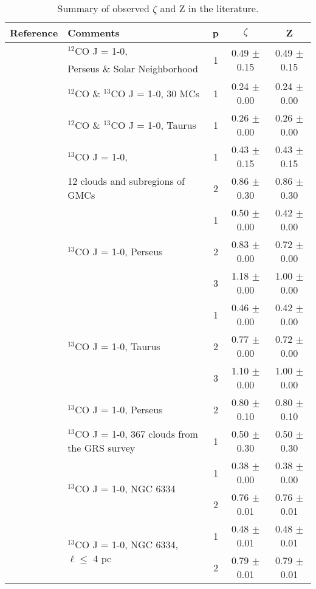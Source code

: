 \begin{table*} 
\centering 
	\begin{tabular}{l|l|ccc} 
	\centering 
		Reference & Comments & p & $\zeta$ & Z \\ \hline  \hline
		\multirow{2}{*}{\citet{Heyer2004}} & $^{12}$CO J = 1-0, & \multirow{2}{*}{1} &  \multirow{2}{*}{0.49 $\pm$  0.15} &  \multirow{2}{*}{0.49 $\pm$  0.15} \\ 
					& Perseus \& Solar Neighborhood & & & \\ \hline
		\multirow{2}{*}{\citet{Heyer2015}} & $^{12}$CO \& $^{13}$CO J = 1-0, 30 MCs & 1 &  0.24 $\pm$  0.00 &  0.24 $\pm$  0.00 \\ 
					 & $^{12}$CO \& $^{13}$CO J = 1-0, Taurus & 1 &  0.26 $\pm$  0.00 &  0.26 $\pm$  0.00 \\  \hline
		\multirow{2}{*}{\citet{Miesch1994}} & $^{13}$CO J = 1-0, & 1 &  0.43 $\pm$  0.15 &  0.43 $\pm$  0.15 \\ 
					   & 12 clouds and subregions of GMCs & 2 &  0.86 $\pm$  0.30 &  0.86 $\pm$  0.30 \\  \hline
		\multirow{6}{*}{\citet{Padoan2003}} & \multirow{3}{*}{$^{13}$CO J = 1-0, Perseus} & 1 &  0.50 $\pm$  0.00 &  0.42 $\pm$  0.00 \\ 
					   &  & 2 &  0.83 $\pm$  0.00 &  0.72 $\pm$  0.00 \\ 
					   &		 & 3 &  1.18 $\pm$  0.00 &  1.00 $\pm$  0.00 \\ 
					  & \multirow{3}{*}{$^{13}$CO J = 1-0, Taurus} & 1 &  0.46 $\pm$  0.00 &  0.42 $\pm$  0.00 \\ 
					   &		 & 2 &  0.77 $\pm$  0.00 &  0.72 $\pm$  0.00 \\ 
					   &		 & 3 &  1.10 $\pm$  0.00 &  1.00 $\pm$  0.00 \\  \hline
		\citet{Padoan2006} & $^{13}$CO J = 1-0, Perseus & 2 &  0.80 $\pm$  0.10 &  0.80 $\pm$  0.10 \\  \hline
		\citet{RomanDuval2011} & $^{13}$CO J = 1-0, 367 clouds from the GRS survey & 1 &  0.50 $\pm$  0.30 &  0.50 $\pm$  0.30 \\  \hline
		\multirow{4}{*}{\citet{Zernickel2015}} & \multirow{2}{*}{$^{13}$CO J = 1-0, NGC 6334} & 1 &  0.38 $\pm$  0.00 &  0.38 $\pm$  0.00 \\ 
					   &		 & 2 &  0.76 $\pm$  0.01 &  0.76 $\pm$  0.01 \\ 
					 & \multirow{2}{*}{$^{13}$CO J = 1-0, NGC 6334, $\ell \leq$ 4 pc}  & 1 &  0.48 $\pm$  0.01 &  0.48 $\pm$  0.01 \\ 
					   & & 2 &  0.79 $\pm$  0.01 &  0.79 $\pm$  0.01 
	\end{tabular} 
	\caption{Summary of observed $\zeta$ and Z in the literature.} 
	\label{tab:discussion:summary_obs} 
\end{table*} 
